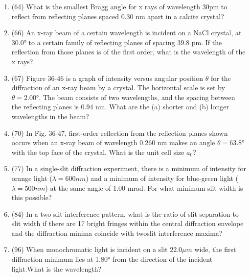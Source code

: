 \documentclass[fleqn]{article}
\begin{document}
  \begin{enumerate}
    \item (64) What is the smallest Bragg angle for x rays of wavelength 30pm to reflect from reflecting planes spaced 0.30 nm apart in a calcite crystal?
    \item (66) An x-ray beam of a certain wavelength is incident on a NaCl crystal, at 30.0° to a certain family of reflecting planes of spacing 39.8 pm. If the reflection from those planes is of the first order, what is the wavelength of the x rays?
    \item (67) Figure 36-46 is a graph of intensity versus angular position $\theta$ for the diffraction of an x-ray beam by a crystal. The horizontal scale is set by $\theta=2.00°$. The beam consists of two wavelengths, and the spacing between the reflecting planes is 0.94 nm. What are the (a) shorter and (b) longer wavelengths in the beam?
    \item (70) In Fig. 36-47, first-order reflection from the reflection planes shown occurs when an x-ray beam of wavelength 0.260 nm makes an angle $\theta=63.8°$ with the top face of the crystal. What is the unit cell size $a_0$?
    \item (77) In a single-slit diffraction experiment, there is a minimum of intensity for orange light ($\lambda=600 nm$) and a minimum of intensity for blue-green light ($\lambda=500 nm$) at the same angle of 1.00 mrad. For what minimum slit width is this possible?
    \item (84) In a two-slit interference pattern, what is the ratio of slit separation to slit width if there are 17 bright fringes within the central diffraction envelope and the diffraction minima coincide with twoslit interference maxima?
    \item (96) When monochromatic light is incident on a slit $22.0 \mu m$ wide, the first diffraction minimum lies at 1.80° from the direction of the incident light.What is the wavelength?
  \end{enumerate}
\end{document}
